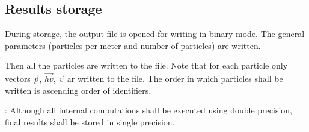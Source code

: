 \subsection{Results storage}

During storage, the output file is opened for writing in binary mode.
The general parameters (particles per meter and number of particles) are
written. 

Then all the particles are written to the file. Note that for each particle only
vectors $\vec{p}$, $\vec{hv}$, $\vec{v}$ ar written to the file. The order in
which particles shall be written is ascending order of identifiers.

: Although all internal computations shall be executed
using double precision, final results shall be stored in single precision.
